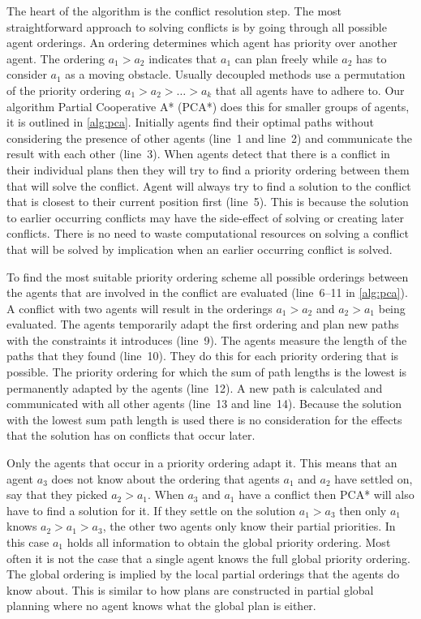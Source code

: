 The heart of the algorithm is the conflict resolution step. The most
straightforward approach to solving conflicts is by going through all possible
agent orderings. An ordering determines which agent has priority over another
agent. The ordering $a_1 > a_2$ indicates that $a_1$ can plan freely while
$a_2$ has to consider $a_1$ as a moving obstacle. Usually decoupled methods use
a permutation of the priority ordering $a_1 > a_2 > \ldots > a_k$ that all
agents have to adhere to. Our algorithm Partial Cooperative A* (PCA*) does this 
for smaller groups of agents, it is outlined in \autoref{alg:pca}. Initially 
agents find their optimal paths without considering the presence of other 
agents (line~1 and line~2) and communicate the result with each other (line~3).
When agents detect that there is a conflict in their individual plans then they 
will try to find a priority ordering between them that will solve the conflict. 
Agent will always try to find a solution to the conflict that is closest to 
their current position first (line~5). This is because the solution to earlier 
occurring conflicts may have the side-effect of solving or creating later 
conflicts. There is no need to waste computational resources on solving a 
conflict that will be solved by implication when an earlier occurring conflict 
is solved.

To find the most suitable priority ordering scheme all possible orderings
between the agents that are involved in the conflict are evaluated (line~6--11 
in \autoref{alg:pca}). A conflict with two agents will result in the orderings 
$a_1 > a_2$ and $a_2 > a_1$ being evaluated. The agents temporarily adapt the 
first ordering and plan new paths with the constraints it introduces (line~9). 
The agents measure the length of the paths that they found (line~10). They do 
this for each priority ordering that is possible. The priority ordering for 
which the sum of path lengths is the lowest is permanently adapted by the 
agents (line~12). A new path is calculated and communicated with all other 
agents (line~13 and line~14). Because the solution with the lowest sum path 
length is used there is no consideration for the effects that the solution has 
on conflicts that occur later.

Only the agents that occur in a priority ordering adapt it. This means that an
agent $a_3$ does not know about the ordering that agents $a_1$ and $a_2$ have
settled on, say that they picked $a_2 > a_1$. When $a_3$ and $a_1$ have a
conflict then PCA* will also have to find a solution for it. If they settle on 
the
solution $a_1 > a_3$ then only $a_1$ knows $a_2 > a_1 > a_3$, the other two
agents only know their partial priorities. In this case $a_1$ holds all 
information to obtain the global priority ordering. Most often it is not the 
case that a single agent knows the
full global priority ordering. The global ordering is implied by the local 
partial orderings that the agents do know about. This is similar to how plans 
are constructed in partial global planning where no agent knows what the global 
plan is either.

